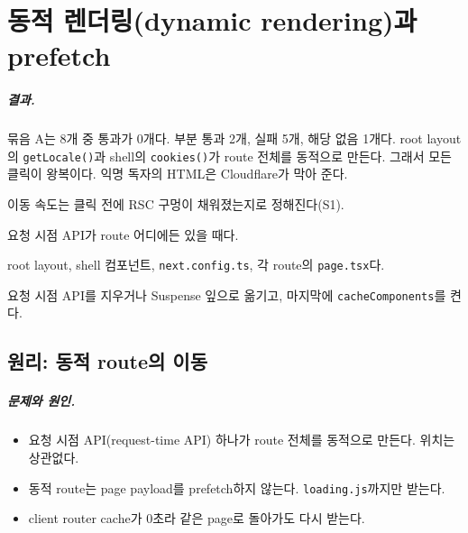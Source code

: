 \chapter{동적 렌더링(dynamic rendering)과 prefetch}\label{ch:dynamic}

\paragraph{결과.}
묶음 A는 8개 중 통과가 0개다. 부분 통과 2개, 실패 5개, 해당 없음 1개다.
root layout의 \texttt{getLocale()}과 shell의 \texttt{cookies()}가 route 전체를 동적으로 만든다.
그래서 모든 클릭이 왕복이다. 익명 독자의 HTML은 Cloudflare가 막아 준다.

\begin{inbrief}
  \item[Why] 이동 속도는 클릭 전에 RSC 구멍이 채워졌는지로 정해진다(S1).
  \item[When] 요청 시점 API가 route 어디에든 있을 때다.
  \item[Where] root layout, shell 컴포넌트, \texttt{next.config.ts}, 각 route의 \texttt{page.tsx}다.
  \item[How] 요청 시점 API를 지우거나 Suspense 잎으로 옮기고, 마지막에 \texttt{cacheComponents}를 켠다.
\end{inbrief}

\section{원리: 동적 route의 이동}\label{sec:dy-principle}

\paragraph{문제와 원인.}
\begin{itemize}[nosep]
  \item 요청 시점 API(request-time API) 하나가 route 전체를 동적으로 만든다. 위치는 상관없다.
  \item 동적 route는 page payload를 prefetch하지 않는다. \texttt{loading.js}까지만 받는다.
  \item client router cache가 0초라 같은 page로 돌아가도 다시 받는다.
\end{itemize}


